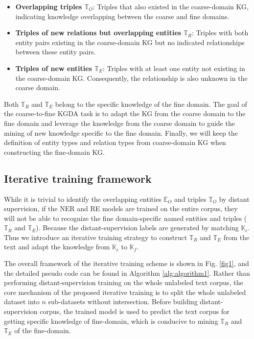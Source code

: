 \documentclass[sigconf]{acmart}
\begin{document}
\begin{itemize}
	\item \textbf{Overlapping triples $\mathbb{T}_O$}: Triples that also existed in the coarse-domain KG, indicating knowledge overlapping between the coarse and fine domains. 
	
	\item \textbf{Triples of new relations but overlapping entities $\mathbb{T}_R$}: Triples with both entity pairs existing in the coarse-domain KG but no indicated relationships between these entity pairs.
	
	\item \textbf{Triples of new entities $\mathbb{T}_E$}: Triples with at least one entity not existing in the coarse-domain KG. Consequently, the relationship is also unknown in the coarse domain.
\end{itemize}

Both $\mathbb{T}_R$ and $\mathbb{T}_E$ belong to the specific knowledge of the fine domain. The goal of the coarse-to-fine KGDA task is to adapt the KG from the coarse domain to the fine domain and leverage the knowledge from the coarse domain to guide the mining of new knowledge specific to the fine domain. Finally, we will keep the definition of entity types and relation types from coarse-domain KG when constructing the fine-domain KG.

\subsection{Iterative training framework}
While it is trivial to identify the overlapping entities $\mathbb{E}_O$ and triples $\mathbb{T}_O$ by distant supervision, if the NER and RE models are trained on the entire corpus, they will not be able to recognize the fine domain-specific named entities and triples ($\mathbb{T}_R$ and $\mathbb{T}_E$). Because the distant-supervision labels are generated by matching $\mathbb{K}_c$. Thus we introduce an iterative training strategy to construct $\mathbb{T}_R$ and $\mathbb{T}_E$ from the text and adapt the knowledge from $\mathbb{K}_c$ to $\mathbb{K}_f$.

The overall framework of the iterative training scheme is shown in Fig. \ref{fig1}, and the detailed pseudo code can be found in Algorithm \ref{alg:algorithm1}. Rather than performing distant-supervision training on the whole unlabeled text corpus, the core mechanism of the proposed iterative training is to split the whole unlabeled dataset into $n$ sub-datasets without intersection. Before building distant-supervision corpus, the trained model is used to predict the text corpus for getting specific knowledge of fine-domain, which is conducive to mining $\mathbb{T}_R$ and $\mathbb{T}_E$ of the fine-domain.
\end{document}
